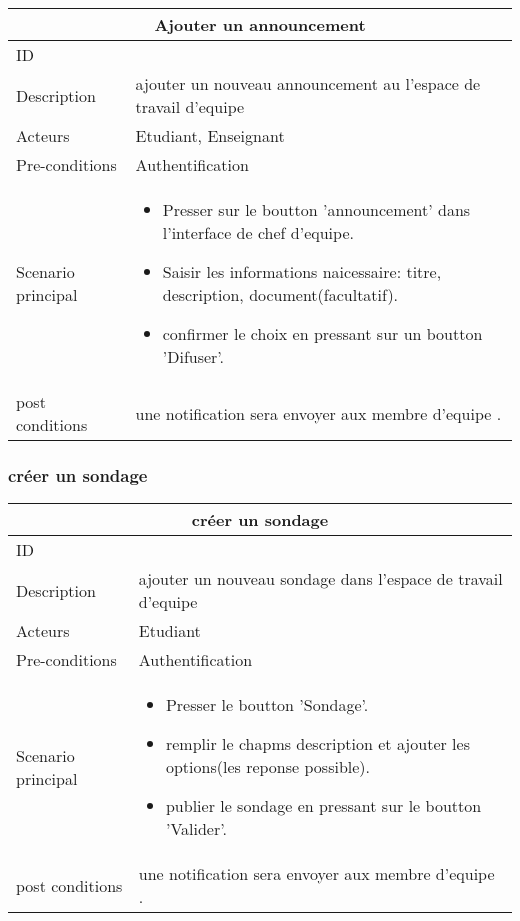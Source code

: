 \documentclass[11pt,fleqn]{book} %
\begin{document}
\begin{center}
\begin{tabularx}{1\textwidth} { | p{4cm} | >{\raggedright\arraybackslash}X |  }
  \hline
  \multicolumn{2}{|c|}{Ajouter un announcement} \\
 \hline
 ID & 3  \\
 \hline
 Description  &  ajouter un nouveau announcement au l'espace de travail d'equipe  \\
  \hline
 Acteurs  & Etudiant, Enseignant   \\
  \hline
 Pre-conditions  & Authentification\\
 \hline
 Scenario principal  &  
 \begin{itemize}
     \item Presser sur le boutton ’announcement’ dans l’interface de chef d’equipe.
     \item Saisir les informations naicessaire: titre, description, document(facultatif).
     \item confirmer le choix en pressant sur un boutton ’Difuser’.
 \end{itemize}\\
  \hline
 post conditions  & une notification sera envoyer aux membre d’equipe .  \\
  \hline
\end{tabularx}
\label{tbl:nicetablelesstable}
\end{center}
\subsubsection{créer un sondage}
\begin{center}
\begin{tabularx}{1\textwidth} { | p{4cm} | >{\raggedright\arraybackslash}X |  }
  \hline
  \multicolumn{2}{|c|}{créer un sondage} \\
 \hline
 ID & 3  \\
 \hline
 Description  &  ajouter un nouveau sondage dans l'espace de travail d'equipe  \\
  \hline
 Acteurs  & Etudiant   \\
  \hline
 Pre-conditions  & Authentification\\
 \hline
 Scenario principal  &  
 \begin{itemize}
     \item Presser le boutton ’Sondage’.
     \item remplir le chapms description et ajouter les options(les reponse possible).
     \item publier le sondage en pressant sur le boutton ’Valider’.
 \end{itemize}\\
  \hline
 post conditions  & une notification sera envoyer aux membre d’equipe . \\
  \hline
\end{tabularx}
\label{tbl:nicetablelesstable}
\end{center}
\end{document}
